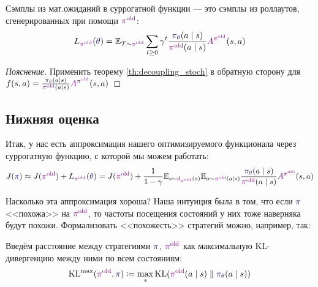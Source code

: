 \begin{proposition}
Сэмплы из мат.ожиданий в суррогатной функции --- это сэмплы из роллаутов, сгенерированных при помощи $\textcolor{ChadPurple}{\pi^{\old}}$:
\begin{equation*}
L_{\textcolor{ChadPurple}{\pi^{\old}}}(\textcolor{ChadBlue}{\theta}) = \E_{\Traj \sim \textcolor{ChadPurple}{\pi^{\old}}} \sum_{t \ge 0} \gamma^t \frac{\textcolor{ChadBlue}{\pi_\theta}(a \mid s)}{\textcolor{ChadPurple}{\pi^{\old}}(a \mid s)} \textcolor{ChadPurple}{A^{\pi^{\old}}}(s, a)
\end{equation*}
\begin{proof}[Пояснение]
Применить теорему \ref{th:decoupling_stoch} в обратную сторону для $f(s, a) \HM= \frac{\textcolor{ChadBlue}{\pi_\theta}(a \mid s)}{\textcolor{ChadPurple}{\pi^{\old}}(a \mid s)} \textcolor{ChadPurple}{A^{\pi^{\old}}}(s, a)$
\end{proof}
\end{proposition}

\subsection{Нижняя оценка}

Итак, у нас есть аппроксимация нашего оптимизируемого функционала через суррогатную функцию, с которой мы можем работать:
$$J(\textcolor{ChadBlue}{\pi}) \approx J(\textcolor{ChadPurple}{\pi^{\old}}) + L_{\textcolor{ChadPurple}{\pi^{\old}}}(\textcolor{ChadBlue}{\theta}) = J(\textcolor{ChadPurple}{\pi^{\old}}) + \frac{1}{1 - \gamma}\E_{s \sim \textcolor{ChadPurple}{d_{\pi^{\old}}}(s)} \E_{a \sim \textcolor{ChadPurple}{\pi^{\old}}(a \mid s)} \frac{\textcolor{ChadBlue}{\pi_\theta}(a \mid s)}{\textcolor{ChadPurple}{\pi^{\old}}(a \mid s)} \textcolor{ChadPurple}{A^{\pi^{\old}}}(s, a)$$

Насколько эта аппроксимация хороша? Наша интуиция была в том, что если $\textcolor{ChadBlue}{\pi}$ <<похожа>> на $\textcolor{ChadPurple}{\pi^{\old}}$, то частоты посещения состояний у них тоже наверняка будут похожи. Формализовать <<похожесть>> стратегий можно, например, так:
\begin{definition}
Введём расстояние между стратегиями $\textcolor{ChadBlue}{\pi}$, $\textcolor{ChadPurple}{\pi^{\old}}$ как максимальную KL-дивергенцию между ними по всем состояниям:
$$\KL^{\max}(\textcolor{ChadPurple}{\pi^{\old}}, \textcolor{ChadBlue}{\pi}) \coloneqq \max_s \KL(\textcolor{ChadPurple}{\pi^{\old}}(a \mid s) \parallel \textcolor{ChadBlue}{\pi_\theta}(a \mid s))$$
\end{definition}

